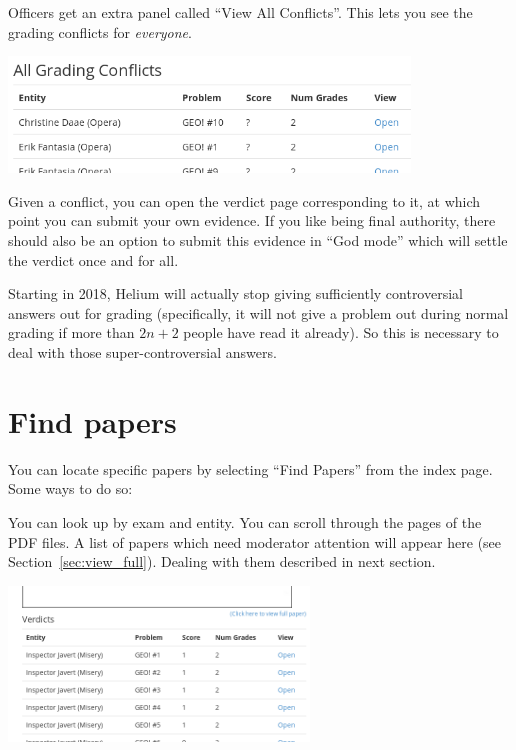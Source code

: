 Officers get an extra panel called ``View All Conflicts''.
This lets you see the grading conflicts for \emph{everyone}.

\begin{center}
	\includegraphics[width=0.8\textwidth]{images/all-conflict.png}
\end{center}

Given a conflict, you can open the verdict page corresponding to it,
at which point you can submit your own evidence.
If you like being final authority,
there should also be an option to submit this evidence in ``God mode''
which will settle the verdict once and for all.

Starting in 2018, Helium will actually stop giving sufficiently
controversial answers out for grading
(specifically, it will not give a problem out during normal grading
if more than $2n+2$ people have read it already).
So this is necessary to deal with those super-controversial answers.

\section{Find papers}
You can locate specific papers
by selecting ``Find Papers'' from the index page.
Some ways to do so:
\begin{itemize}
	\ii You can look up by exam and entity.
	\ii You can scroll through the pages of the PDF files.
	\ii A list of papers which need moderator attention
	will appear here (see Section~\ref{sec:view_full}).
	Dealing with them described in next section.
\end{itemize}

\begin{center}
	\includegraphics[width=0.6\textwidth]{images/viewpaper2.png}
\end{center}

